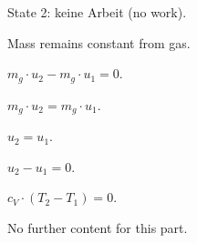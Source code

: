 State 2: keine Arbeit (no work).  

Mass remains constant from gas.  

\( m_g \cdot u_2 - m_g \cdot u_1 = 0 \).  

\( m_g \cdot u_2 = m_g \cdot u_1 \).  

\( u_2 = u_1 \).  

\( u_2 - u_1 = 0 \).  

\( c_V \cdot (T_2 - T_1) = 0 \).  

No further content for this part.